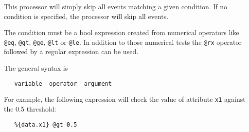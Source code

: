 
This processor will simply skip all events matching a given condition.
If no condition is specified, the processor will skip all events.

The condition must be a bool expression created from numerical operators
like \texttt{@eq}, \texttt{@gt}, \texttt{@ge}, \texttt{@lt} or
\texttt{@le}. In addition to those numerical tests the \texttt{@rx}
operator followed by a regular expression can be used.

The general syntax is

\begin{verbatim}
   variable  operator  argument
\end{verbatim}
For example, the following expression will check the value of attribute
\texttt{x1} against the 0.5 threshold:

\begin{verbatim}
   %{data.x1} @gt 0.5
\end{verbatim}


\begin{table}[h]
\end{table}
